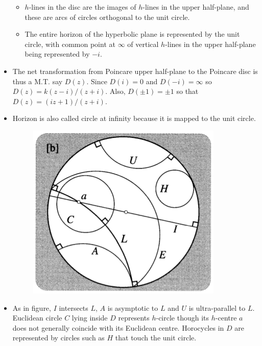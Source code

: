 \documentclass[12pt]{article}
\begin{document}
\begin{itemize}
\begin{itemize}
        \item $h$-lines in the disc are the images of $h$-lines in the upper half-plane, and these are arcs of circles orthogonal to the unit circle.
        
        \item The entire horizon of the hyperbolic plane is represented by the unit circle, with common point at $\infty$ of vertical $h$-lines in the upper half-plane being represented by $-i$.
    \end{itemize}

    \item The net transformation from Poincare upper half-plane to the Poincare disc is thus a M.T. say $D(z)$. Since $D(i)= 0$ and $D(-i)=\infty$ so $D(z) = k(z-i)/(z+i)$. Also, $D(\pm 1) = \pm 1$ so that $D(z) = (iz+1)/(z+i)$.

    \item Horizon is also called circle at infinity because it is mapped to the unit circle.

    \begin{figure}[h!]
        \centering
        \includegraphics[scale=0.7]{fig_28}
        \label{fig_28}
    \end{figure}

    \item As in figure, $I$ intersects $L$, $A$ is asymptotic to $L$ and $U$ is ultra-parallel to $L$. Euclidean circle $C$ lying inside $D$ represents $h$-circle though its $h$-centre $a$ does not generally coincide with its Euclidean centre. Horocycles in $D$ are represented by circles such as $H$ that touch the unit circle.


\end{itemize}
\end{document}
